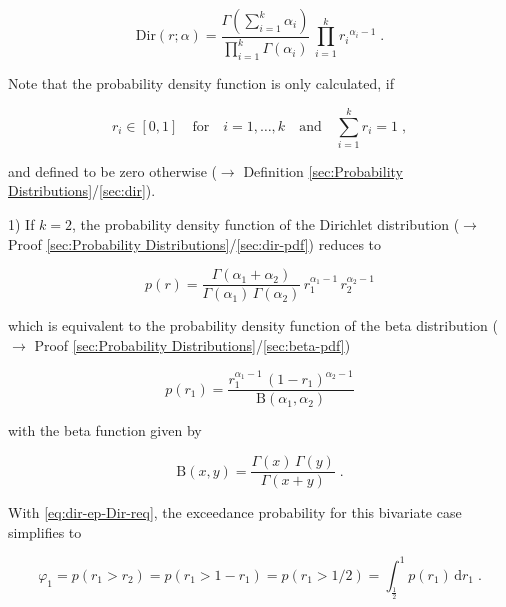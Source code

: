 \documentclass[a4paper,12pt,twoside]{book}
\begin{document}
\begin{equation} \label{eq:dir-ep-Dir-pdf}
\mathrm{Dir}(r; \alpha) = \frac{\Gamma\left( \sum_{i=1}^k \alpha_i \right)}{\prod_{i=1}^k \Gamma(\alpha_i)} \, \prod_{i=1}^k {r_i}^{\alpha_i-1} \; .
\end{equation}

Note that the probability density function is only calculated, if

\begin{equation} \label{eq:dir-ep-Dir-req}
r_i \in [0,1] \quad \text{for} \quad i = 1,\ldots,k \quad \text{and} \quad \sum_{i=1}^k r_i = 1 \; ,
\end{equation}

and defined to be zero otherwise ($\rightarrow$ Definition \ref{sec:Probability Distributions}/\ref{sec:dir}).

\vspace{1em}
1) If $k = 2$, the probability density function of the Dirichlet distribution ($\rightarrow$ Proof \ref{sec:Probability Distributions}/\ref{sec:dir-pdf}) reduces to

\begin{equation} \label{eq:dir-ep-Dir2-pdf}
p(r) = \frac{\Gamma(\alpha_1 + \alpha_2)}{\Gamma(\alpha_1) \, \Gamma(\alpha_2)} \, r_1^{\alpha_1-1} \, r_2^{\alpha_2-1}
\end{equation}

which is equivalent to the probability density function of the beta distribution ($\rightarrow$ Proof \ref{sec:Probability Distributions}/\ref{sec:beta-pdf})

\begin{equation} \label{eq:dir-ep-Beta-pdf}
p(r_1) = \frac{r_1^{\alpha_1-1} \, (1-r_1)^{\alpha_2-1}}{\mathrm{B}(\alpha_1,\alpha_2)}
\end{equation}

with the beta function given by

\begin{equation} \label{eq:dir-ep-beta-fct}
\mathrm{B}(x,y) = \frac{\Gamma(x) \, \Gamma(y)}{\Gamma(x + y)} \; .
\end{equation}

With \eqref{eq:dir-ep-Dir-req}, the exceedance probability for this bivariate case simplifies to

\begin{equation} \label{eq:dir-ep-Dir2-EP-def}
\varphi_1 = p(r_1 > r_2) = p(r_1 > 1 - r_1) = p(r_1 > 1/2) = \int_{\frac{1}{2}}^1 p(r_1) \, \mathrm{d}r_1 \; .
\end{equation}
\end{document}
